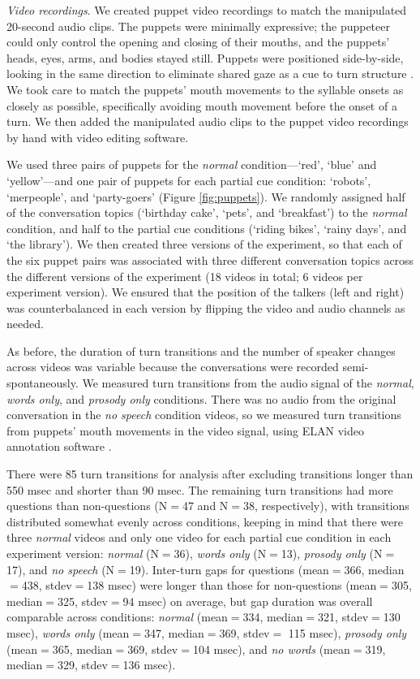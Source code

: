 \documentclass[authoryear, 12pt]{elsarticle}
\begin{document}
\textit{Video recordings}. We created puppet video recordings to match the manipulated 20-second audio clips. The puppets were minimally expressive; the puppeteer could only control the opening and closing of their mouths, and the puppets' heads, eyes, arms, and bodies stayed still. Puppets were positioned side-by-side, looking in the same direction to eliminate shared gaze as a cue to turn structure \citep{thorgrimsson2015}. We took care to match the puppets' mouth movements to the syllable onsets as closely as possible, specifically avoiding mouth movement before the onset of a turn. We then added the manipulated audio clips to the puppet video recordings by hand with video editing software.

We used three pairs of puppets for the \textit{normal} condition---`red', `blue' and `yellow'---and one pair of puppets for each partial cue condition: `robots', `merpeople', and `party-goers' (Figure \ref{fig:puppets}). We randomly assigned half of the conversation topics (`birthday cake', `pets', and `breakfast') to the \textit{normal} condition, and half to the partial cue conditions (`riding bikes', `rainy days', and `the library'). We then created three versions of the experiment, so that each of the six puppet pairs was associated with three different conversation topics across the different versions of the experiment (18 videos in total; 6 videos per experiment version). We ensured that the position of the talkers (left and right) was counterbalanced in each version by flipping the video and audio channels as needed.

As before, the duration of turn transitions and the number of speaker changes across videos was variable because the conversations were recorded semi-spontaneously. We measured turn transitions from the audio signal of the \textit{normal}, \textit{words only}, and \textit{prosody only} conditions. There was no audio from the original conversation in the \textit{no speech} condition videos, so we measured turn transitions from puppets' mouth movements in the video signal, using ELAN video annotation software \citep{ELAN}.

There were 85 turn transitions for analysis after excluding transitions longer than 550 msec and shorter than 90 msec. The remaining turn transitions had more questions than non-questions (N$=$47 and N$=$38, respectively), with transitions distributed somewhat evenly across conditions, keeping in mind that there were three \textit{normal} videos and only one video for each partial cue condition in each experiment version: \textit{normal} (N$=$36), \textit{words only} (N$=$13), \textit{prosody only} (N$=$17), and \textit{no speech} (N$=$19). Inter-turn gaps for questions (mean$=$366, median$=$438, stdev$=$138 msec) were longer than those for non-questions (mean$=$305, median$=$325, stdev$=$94 msec) on average, but gap duration was overall comparable across conditions: \textit{normal} (mean$=$334, median$=$321, stdev$=$130 msec), \textit{words only} (mean$=$347, median$=$369, stdev$=$ 115 msec), \textit{prosody only} (mean$=$365, median$=$369, stdev$=$104 msec), and \textit{no words} (mean$=$319, median$=$329, stdev$=$136 msec).
\end{document}
